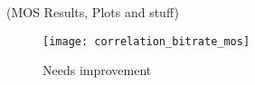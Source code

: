 (MOS Results, Plots and stuff)

\begin{figure}[h]
	\centering
	\texttt{[image: correlation\_bitrate\_mos]}
	\caption{Needs improvement}
	\label{fig:workflow:state_machine}
\end{figure}
